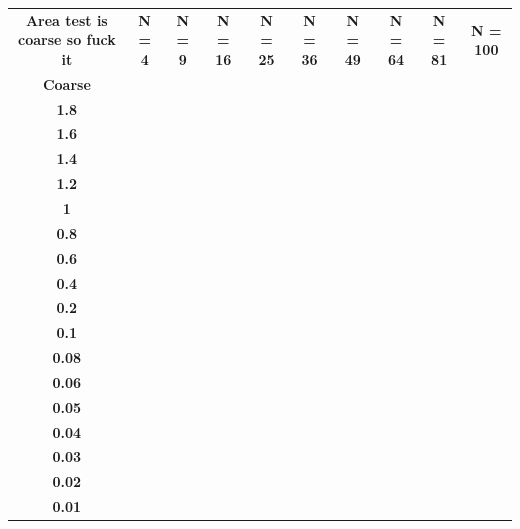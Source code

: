 \noindent\begin{minipage}{\textwidth}
\centering
\begin{tabular}{c c c c c c c c c c }
\textbf{Area test is coarse so fuck it} &  \textbf{N = 4}	& \textbf{N = 9}	& \textbf{N = 16}	& \textbf{N = 25}	&\textbf{N = 36}&	\textbf{N = 49}	& \textbf{N = 64	}& \textbf{N = 81}	& \textbf{N = 100}  \\
\textbf{Coarse} & 		&		& 	        & 		&          &                   &               &             &                \\
\textbf{1.8	} & 				& 			&         &         &      &          &         &         &          \\
\textbf{1.6	} & 				& 			&         &         &      &          &         &         &          \\
\textbf{1.4	} & 				& 			&         &         &      &          &         &         &          \\
\textbf{1.2	} & 				& 			&         &         &      &          &         &         &          \\
\textbf{1}    & 				& 		  &         &         &      &          &         &         &          \\
\textbf{0.8	} & 				& 			&         &         &      &          &         &         &          \\
\textbf{0.6	} & 				& 			&         &         &      &          &         &         &          \\
\textbf{0.4	} & 				& 			&         &         &      &          &         &         &          \\
\textbf{0.2	} & 				& 			&         &         &      &          &         &         &          \\
\textbf{0.1	} & 				& 			&         &         &      &          &         &         &          \\
\textbf{0.08} & 				& 			& 	      &         &      &          &         &         &          \\
\textbf{0.06} & 				& 			& 	      &         &      &          &         &         &          \\
\textbf{0.05} & 				& 			& 	      &         &      &          &         &         &          \\
\textbf{0.04} & 				& 			& 	      &         &      &          &         &         &          \\
\textbf{0.03} & 				& 			& 	      &         &      &          &         &         &          \\
\textbf{0.02} & 				& 			& 	      &         &      &          &         &         &          \\
\textbf{0.01} & 				& 			& 	      &         &      &          &         &         &          \\
\end{tabular}
\label{study}
\end{minipage}

